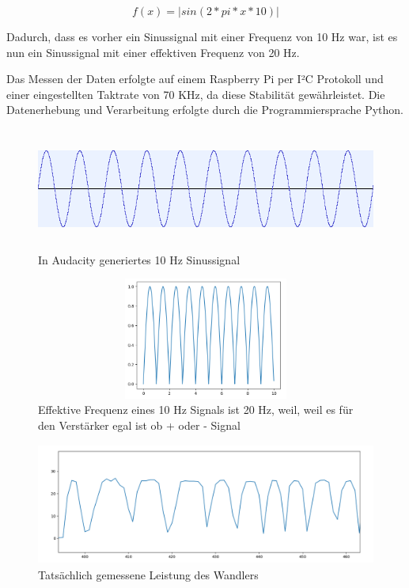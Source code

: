 \begin{flushleft}
\begin{equation}[H]
f(x) = |sin(2 * pi*x*10)|
\end{equation}

Dadurch, dass es vorher ein Sinussignal mit einer Frequenz von 10 Hz war, ist es nun ein Sinussignal mit einer effektiven Frequenz von 20 Hz.

Das Messen der Daten erfolgte auf einem Raspberry Pi per I²C Protokoll und einer eingestellten Taktrate von 70 KHz, da diese Stabilität gewährleistet. Die Datenerhebung und Verarbeitung erfolgte durch die Programmiersprache Python.

\begin{figure}[H]
    \centering
    \includegraphics[height= 4cm, width = 12cm]{Pictures/Sinus_Aud.png}
    \caption{In Audacity generiertes 10 Hz Sinussignal}
\end{figure}

\begin{figure}[H]
    \centering
    \includegraphics[height= 4cm, width = 12cm]{Pictures/Clapped_Sine.png}
    \caption{Effektive Frequenz eines 10 Hz Signals ist 20 Hz, weil, weil es für den Verstärker egal ist ob + oder - Signal }
\end{figure}

\begin{figure}[H]
    \centering
    \includegraphics[height= 4cm, width = 12cm]{Pictures/TatsDaten.png}
    \caption{Tatsächlich gemessene Leistung des Wandlers}
\end{figure}



\end{flushleft}
